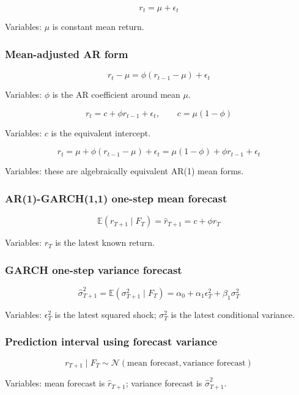 \documentclass[
  8pt,
  twocolumn]{extarticle}
\begin{document}
\[
r_t=\mu+\epsilon_t
\]

Variables: \(\mu\) is constant mean return.

\subsubsection{Mean-adjusted AR form}\label{mean-adjusted-ar-form}

\[
r_t-\mu=\phi(r_{t-1}-\mu)+\epsilon_t
\]

Variables: \(\phi\) is the AR coefficient around mean \(\mu\).

\[
r_t=c+\phi r_{t-1}+\epsilon_t,\qquad c=\mu(1-\phi)
\]

Variables: \(c\) is the equivalent intercept.

\[
r_t=\mu+\phi(r_{t-1}-\mu)+\epsilon_t=\mu(1-\phi)+\phi r_{t-1}+\epsilon_t
\]

Variables: these are algebraically equivalent AR(1) mean forms.

\subsubsection{AR(1)-GARCH(1,1) one-step mean
forecast}\label{ar1-garch11-one-step-mean-forecast}

\[
\mathbb E(r_{T+1}\mid F_T)=\hat r_{T+1}=c+\phi r_T
\]

Variables: \(r_T\) is the latest known return.

\subsubsection{GARCH one-step variance
forecast}\label{garch-one-step-variance-forecast}

\[
\hat\sigma_{T+1}^2=\mathbb E(\sigma_{T+1}^2\mid F_T)=\alpha_0+\alpha_1\epsilon_T^2+\beta_1\sigma_T^2
\]

Variables: \(\epsilon_T^2\) is the latest squared shock; \(\sigma_T^2\)
is the latest conditional variance.

\subsubsection{Prediction interval using forecast
variance}\label{prediction-interval-using-forecast-variance}

\[
r_{T+1}\mid F_T\sim\mathcal N(\text{mean forecast},\text{variance forecast})
\]

Variables: mean forecast is \(\hat r_{T+1}\); variance forecast is
\(\hat\sigma_{T+1}^2\).
\end{document}
